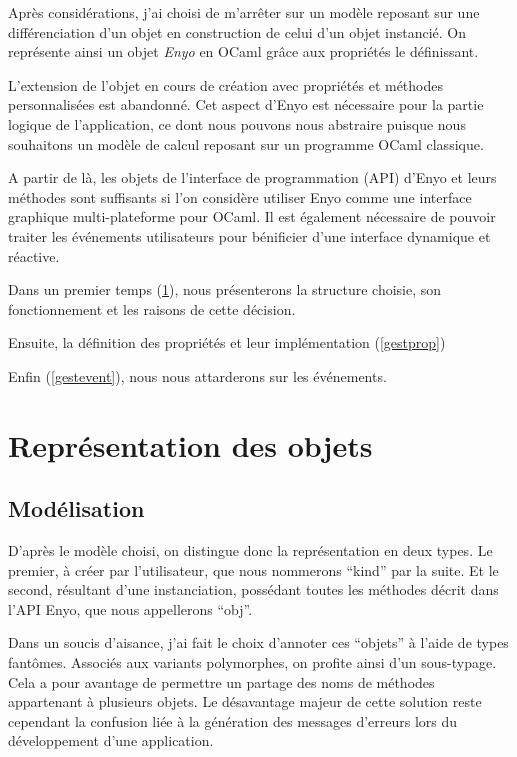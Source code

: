 \documentclass[11pt,a4paper]{report}
\begin{document}
Après considérations, j'ai choisi de m'arrêter sur un modèle reposant sur une différenciation
d'un objet en construction de celui d'un objet instancié. On représente ainsi un objet \emph{Enyo}
en OCaml grâce aux propriétés le définissant.

\medskip
{}
\medskip

L'extension de l'objet en cours de création avec propriétés et méthodes personnalisées est 
abandonné. Cet aspect d'Enyo est nécessaire pour la partie logique de l'application, ce dont 
nous pouvons nous abstraire puisque nous souhaitons un modèle de calcul reposant sur 
un programme OCaml classique.

A partir de là, les objets de l'interface de programmation (API) d'Enyo et leurs méthodes 
sont suffisants si l'on considère utiliser Enyo comme une interface graphique multi-plateforme
pour OCaml. Il est également nécessaire de pouvoir traiter les événements utilisateurs pour bénificier 
d'une interface dynamique et réactive.

Dans un premier temps (\ref{repobj}), nous présenterons la structure choisie, son fonctionnement et les raisons
de cette décision.

Ensuite, la définition des propriétés et leur implémentation (\ref{gestprop})

Enfin (\ref{gestevent}), nous nous attarderons sur les événements.

\section{Représentation des objets}\label{repobj}
\subsection{Modélisation}
D'après le modèle choisi, on distingue donc la représentation en deux types. Le premier,
à créer par l'utilisateur, que nous nommerons ``kind'' par la suite. Et le second,
résultant d'une instanciation, possédant toutes les méthodes décrit dans l'API Enyo, que
nous appellerons ``obj''.

Dans un soucis d'aisance, j'ai fait le choix d'annoter ces ``objets'' à l'aide de types fantômes.
Associés aux variants polymorphes, on profite ainsi d'un sous-typage.
Cela a pour avantage de permettre un partage des noms de méthodes appartenant à plusieurs objets. 
Le désavantage majeur de cette solution reste cependant la confusion liée 
à la génération des messages d'erreurs lors du développement d'une application.
\end{document}
